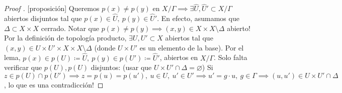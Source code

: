 \begin{proof}[Proof ][proposición]
	Queremos $p(x) \neq p(y)$ en $X / \Gamma \implies \exists \hat{U}, \hat{U}' \subset X / \Gamma$ abiertos disjuntos tal que $p(x) \in \hat{U},\ p(y) \in \hat{U}'$. En efecto, asumamos que $\Delta \subset X \times X$ cerrado. Notar que $p(x) \neq p(y) \implies (x,y) \in X \times X \setminus \Delta$ abierto! Por la definición de topología producto, $\exists U,U' \subset X$ abiertos tal que $(x,y) \in U \times U' \times  X \times X \setminus \Delta$ (donde $U \times U'$ es un elemento de la base). Por el lema, $p(x) \in p(U) \coloneq \hat{U},\ p(y) \in p(U') \coloneq \hat{U}'$, abiertos en $X / \Gamma$. Solo falta verificar que $p(U), p(U)$ disjuntos: (usar que $U \times U' \cap \Delta = \varnothing$) Si $z \in p(U) \cap p(U') \implies z = p(u) = p(u'),\ u \in U,\ u' \in U' \implies u' = g \cdot u,\ g \in \Gamma \implies (u,u') \in U \times U' \cap \Delta$, lo que es una contradicción!
\end{proof}
